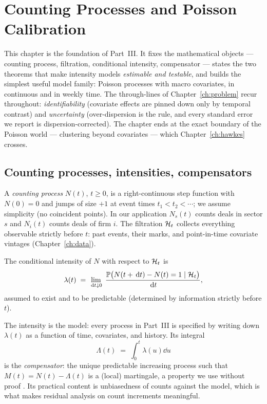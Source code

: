 \chapter{Counting Processes and Poisson Calibration}
\label{ch:poisson}

This chapter is the foundation of Part~III. It fixes the mathematical objects --- counting
process, filtration, conditional intensity, compensator --- states the two theorems that
make intensity models \emph{estimable and testable}, and builds the simplest useful model
family: Poisson processes with macro covariates, in continuous and in weekly time. The
through-lines of Chapter~\ref{ch:problem} recur throughout: \emph{identifiability}
(covariate effects are pinned down only by temporal contrast) and \emph{uncertainty}
(over-dispersion is the rule, and every standard error we report is dispersion-corrected).
The chapter ends at the exact boundary of the Poisson world --- clustering beyond
covariates --- which Chapter~\ref{ch:hawkes} crosses.

\section{Counting processes, intensities, compensators}
\label{sec:poi-setup}

A \emph{counting process} $N(t)$, $t \ge 0$, is a right-continuous step function with
$N(0) = 0$ and jumps of size $+1$ at event times $t_1 < t_2 < \cdots$; we assume
simplicity (no coincident points). In our application $N_s(t)$ counts deals in sector $s$
and $N_i(t)$ counts deals of firm $i$. The filtration $\mathcal{H}_t$ collects everything
observable strictly before $t$: past events, their marks, and point-in-time covariate
vintages (Chapter~\ref{ch:data}).

\begin{definition}
\label{def:poi-intensity}
The conditional intensity of $N$ with respect to $\mathcal{H}_t$ is
\begin{equation}
\lambda(t) \;=\; \lim_{\,\mathrm{d} t \downarrow 0}\;
\frac{\mathbb{P}\big(N(t + \,\mathrm{d} t) - N(t) = 1 \mid \mathcal{H}_t\big)}{\,\mathrm{d} t},
\label{eq:poi-intensity}
\end{equation}
assumed to exist and to be predictable (determined by information strictly before $t$).
\end{definition}

The intensity is the model: every process in Part~III is specified by writing down
$\lambda(t)$ as a function of time, covariates, and history. Its integral
\begin{equation}
\Lambda(t) \;=\; \int_0^t \lambda(u)\dd u
\label{eq:poi-compensator}
\end{equation}
is the \emph{compensator}: the unique predictable increasing process such that
$M(t) = N(t) - \Lambda(t)$ is a (local) martingale, a property we use without proof
\cite{bremaud1996,daley2003}. Its practical content is unbiasedness of counts against the
model, which is what makes residual analysis on count increments meaningful.

